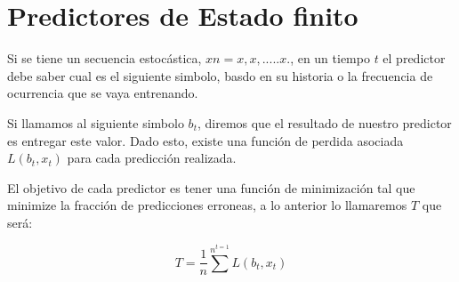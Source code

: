 




\section{Predictores de Estado finito}


Si se tiene un secuencia estocástica, $x n = x , x ,.....x .  $, en un tiempo $t$ el predictor debe saber cual es el siguiente simbolo, basdo en su historia o la frecuencia de ocurrencia que se vaya entrenando.

Si llamamos al siguiente simbolo $b_{t}$, diremos que el resultado de nuestro predictor es entregar este valor. Dado esto, existe una función de perdida asociada $L( b_{t},x_{t} )$ para cada predicción realizada. 

El objetivo de cada predictor es tener una función de minimización tal que minimize la fracción de predicciones erroneas, a lo anterior lo llamaremos $T$ que será:

$$ T = \dfrac{1}{n} \sum^{n}^{t=1} {L( b_{t},x_{t} ) }  $$



